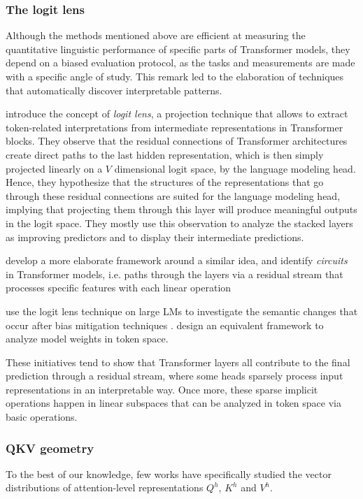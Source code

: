 \subsubsection{The logit lens}

Although the methods mentioned above are efficient at measuring the quantitative linguistic performance of specific parts of Transformer models, they depend on a biased evaluation protocol, as the tasks and measurements are made with a specific angle of study. This remark led to the elaboration of techniques that automatically discover interpretable patterns.

\citet{logit_lens} introduce the concept of \textit{logit lens}, a projection technique that allows to extract token-related interpretations from intermediate representations in Transformer blocks. They observe that the residual connections of Transformer architectures create direct paths to the last hidden representation, which is then simply projected linearly on a $V$ dimensional logit space, by the language modeling head. Hence, they hypothesize that the structures of the representations that go through these residual connections are suited for the language modeling head, implying that projecting them through this layer will produce meaningful outputs in the logit space. They mostly use this observation to analyze the stacked layers as improving predictors and to display their intermediate predictions.

\citet{elhage2021mathematical} develop a more elaborate framework around a similar idea, and identify \textit{circuits} in Transformer models, i.e. paths through the layers via a residual stream that processes specific features with each linear operation

\citet{prakash-lee-2023-layered} use the logit lens technique on large LMs to investigate the semantic changes that occur after bias mitigation techniques \citep{ravfogel-etal-2020-null}. \citet{dar-etal-2023-analyzing} design an equivalent framework to analyze model weights in token space.

These initiatives tend to show that Transformer layers all contribute to the final prediction through a residual stream, where some heads sparsely process input representations in an interpretable way. Once more, these sparse implicit operations happen in linear subspaces that can be analyzed in token space via basic operations.

\subsubsection{QKV geometry}
To the best of our knowledge, few works have specifically studied the vector distributions of attention-level representations $Q^h$, $K^h$ and $V^h$.

